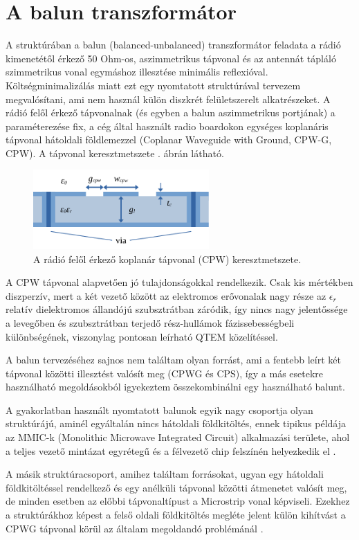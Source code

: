 \section{A balun transzformátor}
	A struktúrában a balun (balanced-unbalanced) transzformátor feladata a rádió kimenetétől érkező 50 Ohm-os, aszimmetrikus tápvonal és az antennát tápláló szimmetrikus vonal egymáshoz illesztése minimális reflexióval. Költségminimalizálás miatt ezt egy nyomtatott struktúrával tervezem megvalósítani, ami nem használ külön diszkrét felületszerelt alkatrészeket. A rádió felől érkező tápvonalnak (és egyben a balun aszimmetrikus portjának) a paraméterezése fix, a cég által használt radio boardokon egységes koplanáris tápvonal hátoldali földlemezzel (Coplanar Waveguide with Ground, CPW-G, CPW). A tápvonal keresztmetszete . ábrán látható.
\begin{figure}[h]
	\centering
	\includegraphics[width=0.6\textwidth]{kep/cpw.pdf}
	\caption{A rádió felől érkező koplanár tápvonal (CPW) keresztmetszete.}
	\label{fig:cpw}
\end{figure}
	A CPW tápvonal alapvetően jó tulajdonságokkal rendelkezik. Csak kis mértékben diszperzív, mert a két vezető között az elektromos erővonalak nagy része az $\epsilon_r$ relatív dielektromos állandójú szubsztrátban záródik, így nincs nagy jelentőssége a levegőben és szubsztrátban terjedő rész-hullámok fázissebességbeli különbségének, viszonylag pontosan leírható QTEM közelítéssel.
\par A balun tervezéséhez sajnos nem találtam olyan forrást, ami a fentebb leírt két tápvonal közötti illesztést valósít meg (CPWG és CPS), így a más esetekre használható megoldásokból igyekeztem összekombinálni egy használható balunt.
\par A gyakorlatban használt nyomtatott balunok egyik nagy csoportja olyan struktúrájú, aminél egyáltalán nincs hátoldali földkitöltés, ennek tipikus példája az MMIC-k (Monolithic Microwave Integrated Circuit) alkalmazási területe, ahol a teljes vezető mintázat egyrétegű és a félvezető chip felszínén helyezkedik el \cite{cpw-ccs, easy-balun, 0-55GHz, 0-110GHz}.
\par A másik struktúracsoport, amihez találtam forrásokat, ugyan egy hátoldali földkitöltéssel rendelkező és egy anélküli tápvonal közötti átmenetet valósít meg, de minden esetben az előbbi tápvonaltípust a Microstrip vonal képviseli. Ezekhez a struktúrákhoz képest a felső oldali földkitöltés megléte jelent külön kihítvást a CPWG tápvonal körül az általam megoldandó problémánál \cite{cpw-ccs, uwb-ms-cps, conv-balun-1, conv-balun-2, wb-cps-ms}.

